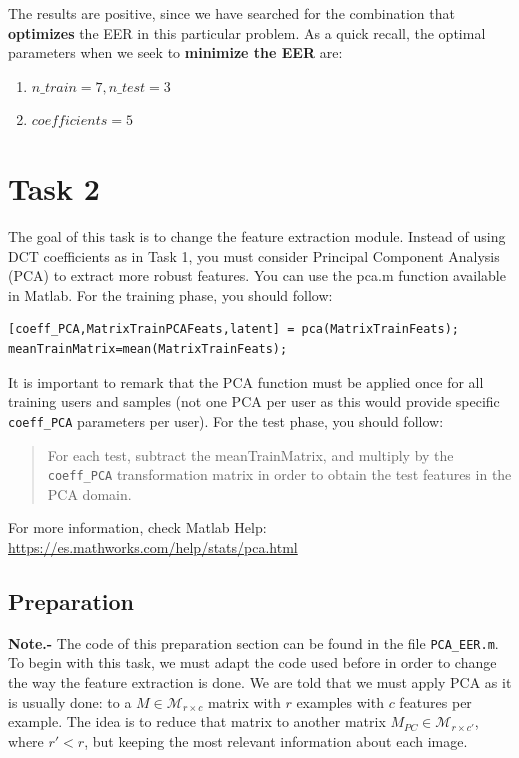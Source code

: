 \documentclass[a4paper]{article}
\def\inline{\lstinline[basicstyle=\ttfamily,keywordstyle={}]}
\begin{document}
The results are positive, since we have searched for the combination that \textbf{optimizes} the EER in this particular problem. As a quick recall, the optimal parameters when we seek to \textbf{minimize the EER} are:
\begin{enumerate}
\item \(n\_train = 7, n\_test = 3\)
\item \(coefficients = 5\)
\end{enumerate}


\section{Task 2}
The goal of this task is to change the feature extraction module. Instead of using DCT coefficients as in Task 1, you must consider Principal Component Analysis (PCA) to extract more robust features. 
You can use the pca.m function available in Matlab. For the training phase, you should follow:
\begin{verbatim}
[coeff_PCA,MatrixTrainPCAFeats,latent] = pca(MatrixTrainFeats);
meanTrainMatrix=mean(MatrixTrainFeats);
\end{verbatim}
It is important to remark that the PCA function must be applied once for all training users and samples (not one PCA per user as this would provide specific \inline{coeff_PCA} parameters per user).  
For the test phase, you should follow:
\begin{quote}
For each test, subtract the meanTrainMatrix, and multiply by the \inline{coeff_PCA} transformation matrix in order to obtain the test features in the PCA domain.
\end{quote}
For more information, check Matlab Help: \url{https://es.mathworks.com/help/stats/pca.html}

\subsection*{Preparation}

\textbf{Note.-} The code of this preparation section can be found in the file \inline{PCA_EER.m}.\\

To begin with this task, we must adapt the code used before in order to change the way the feature extraction is done. We are told that we must apply PCA as it is usually done: to a \(M \in \mathcal M_{r \times c}\) matrix with \(r\) examples with \(c\) features per example. The idea is to reduce that matrix to another matrix \(M_{PC} \in \mathcal M_{r \times c'}\), where \(r' < r\), but keeping the most relevant information about each image.
\end{document}

